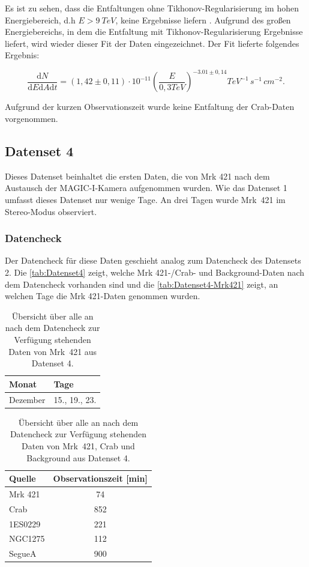 Es ist zu sehen, dass die Entfaltungen ohne Tikhonov-Regularisierung im hohen Energiebereich, d.h $E>\SI{9}{TeV}$, keine Ergebnisse liefern .
Aufgrund des großen Energiebereichs, in dem die Entfaltung mit Tikhonov-Regularisierung Ergebnisse liefert, wird wieder dieser Fit der Daten eingezeichnet.
Der Fit lieferte folgendes Ergebnis:

\begin{equation}
 \frac{\mathrm{d}N}{\mathrm{d}E\mathrm{d}A\mathrm{d}t}=(1,42 \pm 0,11) \cdot 10^{-11}\left( \frac{E}{0,3 \si{TeV}} \right)^{-3.01\pm 0,14} \si{TeV^{-1}\,s^{-1}\,cm^{-2}}.
\end{equation}

Aufgrund der kurzen Observationszeit wurde keine Entfaltung der Crab-Daten vorgenommen.

\FloatBarrier

\subsection{Datenset 4}
\label{subsec:Datenset_4}
Dieses Datenset beinhaltet die ersten Daten, die von Mrk 421 nach dem Austausch der MAGIC-I-Kamera aufgenommen wurden. 
Wie das Datenset 1 umfasst dieses Datenset nur wenige Tage. 
An drei Tagen wurde Mrk~421 im Stereo-Modus observiert. 

\subsubsection{Datencheck}
Der Datencheck für diese Daten geschieht analog zum Datencheck des Datensets 2. 
Die \autoref{tab:Datenset4} zeigt, welche Mrk 421-/Crab- und Background-Daten nach dem Datencheck vorhanden sind und die \autoref{tab:Datenset4-Mrk421} zeigt, an welchen Tage die Mrk 421-Daten genommen wurden.

\begin{table}[!h]
\centering
\caption{Übersicht über alle an nach dem Datencheck zur Verfügung stehenden Daten von Mrk~421 aus Datenset 4.}
\label{tab:Datenset4-Mrk421}
\begin{tabular}{ll}
  \toprule
  Monat & Tage\\
  \midrule
  \midrule
Dezember & 15., 19., 23.\\
  \bottomrule
\end{tabular}
\end{table}


\begin{table}[!h]
\centering
\caption{Übersicht über alle an nach dem Datencheck zur Verfügung stehenden Daten von Mrk~421, Crab und Background aus Datenset 4.}
\label{tab:Datenset4}
\begin{tabular}{lc}
  \toprule
  Quelle & Observationszeit [min]\\
  \midrule
  \midrule
  Mrk 421 & 74\\
  \midrule
  Crab & 852\\
  \midrule
  1ES0229 & 221 \\
  NGC1275 & 112 \\
  SegueA & 900  \\
  \bottomrule
  \bottomrule
\end{tabular}
\end{table}

